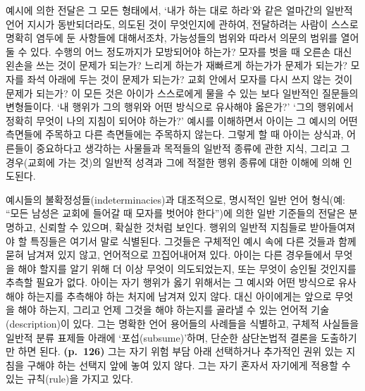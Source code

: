예시에 의한 전달은 그 모든 형태에서, ‘내가 하는 대로 하라’와 같은
얼마간의 일반적 언어 지시가 동반되더라도, 의도된 것이 무엇인지에 관하여,
전달하려는 사람이 스스로 명확히 염두에 둔 사항들에 대해서조차,
가능성들의 범위와 따라서 의문의 범위를 열어둘 수 있다. 수행의 어느
정도까지가 모방되어야 하는가? 모자를 벗을 때 오른손 대신 왼손을 쓰는
것이 문제가 되는가? 느리게 하는가 재빠르게 하는가가 문제가 되는가?
모자를 좌석 아래에 두는 것이 문제가 되는가? 교회 안에서 모자를 다시 쓰지
않는 것이 문제가 되는가? 이 모든 것은 아이가 스스로에게 물을 수 있는
보다 일반적인 질문들의 변형들이다. ‘내 행위가 그의 행위와 어떤 방식으로
유사해야 옳은가?’ ‘그의 행위에서 정확히 무엇이 나의 지침이 되어야
하는가?’ 예시를 이해하면서 아이는 그 예시의 어떤 측면들에 주목하고 다른
측면들에는 주목하지 않는다. 그렇게 할 때 아이는 상식과, 어른들이
중요하다고 생각하는 사물들과 목적들의 일반적 종류에 관한 지식, 그리고 그
경우(교회에 가는 것)의 일반적 성격과 그에 적절한 행위 종류에 대한 이해에
의해 인도된다.

예시들의 불확정성들(indeterminacies)과 대조적으로, 명시적인 일반 언어
형식(예: “모든 남성은 교회에 들어갈 때 모자를 벗어야 한다”)에 의한
일반 기준들의 전달은 분명하고, 신뢰할 수 있으며, 확실한 것처럼 보인다.
행위의 일반적 지침들로 받아들여져야 할 특징들은 여기서 말로 식별된다.
그것들은 구체적인 예시 속에 다른 것들과 함께 묻혀 남겨져 있지 않고,
언어적으로 끄집어내어져 있다. 아이는 다른 경우들에서 무엇을 해야 할지를
알기 위해 더 이상 무엇이 의도되었는지, 또는 무엇이 승인될 것인지를
추측할 필요가 없다. 아이는 자기 행위가 옳기 위해서는 그 예시와 어떤
방식으로 유사해야 하는지를 추측해야 하는 처지에 남겨져 있지 않다. 대신
아이에게는 앞으로 무엇을 해야 하는지, 그리고 언제 그것을 해야 하는지를
골라낼 수 있는 언어적 기술(description)이 있다. 그는 명확한 언어
용어들의 사례들을 식별하고, 구체적 사실들을 일반적 분류 표제들 아래에
‘포섭(subsume)’하며, 단순한 삼단논법적 결론을 도출하기만 하면 된다.
\textbf{(p.~126)} 그는 자기 위험 부담 아래 선택하거나 추가적인 권위 있는
지침을 구해야 하는 선택지 앞에 놓여 있지 않다. 그는 자기 혼자서 자기에게
적용할 수 있는 규칙(rule)을 가지고 있다.

